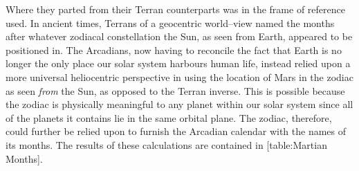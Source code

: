 Where they parted from their Terran counterparts was in the frame of reference used. In ancient times, Terrans of a geocentric world--view named the months after whatever zodiacal constellation the Sun, as seen from Earth, appeared to be positioned in. The Arcadians, now having to reconcile the fact that Earth is no longer the only place our solar system harbours human life, instead relied upon a more universal heliocentric perspective in using the location of Mars in the zodiac as seen {\it from} the Sun, as opposed to the Terran inverse. This is possible because the zodiac is physically meaningful to any planet within our solar system since all of the planets it contains lie in the same orbital plane. The zodiac, therefore, could further be relied upon to furnish the Arcadian calendar with the names of its months. The results of these calculations are contained in [table:Martian Months].
\crlf


